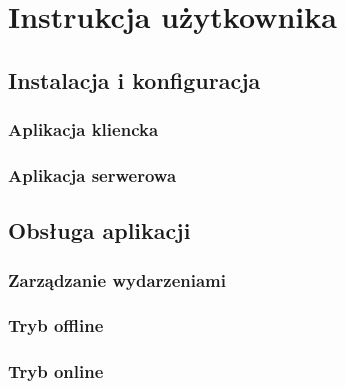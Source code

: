 \chapter{Instrukcja użytkownika}
\label{cha:instrUzytk}


\section{Instalacja i konfiguracja}
\label{sec:apKli}



\subsection{Aplikacja kliencka}
\label{sec:instrApKli}



\subsection{Aplikacja serwerowa}
\label{sec:intrApSerw}



\section{Obsługa aplikacji}
\label{sec:obslAp}



\subsection{Zarządzanie wydarzeniami}
\label{sec:instrZarzWyd}



\subsection{Tryb offline}
\label{sec:instrTrybOff}



\subsection{Tryb online}
\label{sec:instrTrybOn}